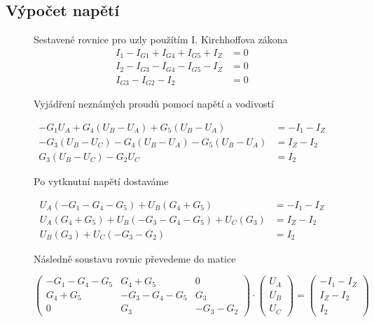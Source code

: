 \subsection{Výpočet napětí}
\begin{figure}[H]
  Sestavené rovnice pro uzly použítím I. Kirchhoffova zákona
  \begin{equation*}
    \begin{aligned}
      I_1 - I_{G1} + I_{G4} + I_{G5} + I_Z & = 0 \\
      I_2 - I_{G3} - I_{G4} - I_{G5} - I_Z & = 0 \\
      I_{G3} - I_{G2} - I_2                & = 0
    \end{aligned}
  \end{equation*}


  Vyjádření neznámých proudů pomocí napětí a vodivostí

  \begin{equation*}
    \begin{aligned}
      -G_1 U_A + G_4 (U_B - U_A) + G_5 (U_B - U_A)         & = -I_1 - I_Z \\
      -G_3 (U_B - U_C) - G_4 (U_B - U_A) - G_5 (U_B - U_A) & = I_Z - I_2  \\
      G_3 (U_B - U_C) - G_2 U_C                            & = I_2
    \end{aligned}
  \end{equation*}


  Po vytknutní napětí dostaváme

  \begin{equation*}
    \begin{aligned}
      U_A (-G_1 - G_4 - G_5) + U_B (G_4 + G_5)            & = -I_1 - I_Z \\
      U_A (G_4 + G_5) + U_B (-G_3 - G_4 -G_5) + U_C (G_3) & = I_Z - I_2  \\
      U_B (G_3) + U_C (-G_3 - G_2)                        & = I_2
    \end{aligned}
  \end{equation*}

  Následně soustavu rovnic převedeme do matice

  $$
    \begin{pmatrix}
      -G_1-G_4-G_5 & G_4+G_5      & 0        \\
      G_4+G_5      & -G_3-G_4-G_5 & G_3      \\
      0            & G_3          & -G_3-G_2
    \end{pmatrix}
    \cdot
    \begin{pmatrix}
      U_A \\
      U_B \\
      U_C
    \end{pmatrix}
    =
    \begin{pmatrix}
      -I_1-I_Z \\
      I_Z-I_2  \\
      I_2
    \end{pmatrix}
  $$
\end{figure}

